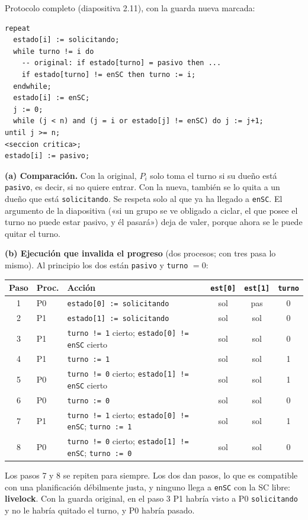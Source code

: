 \begin{solucion}
Protocolo completo (diapositiva 2.11), con la guarda nueva marcada:
\begin{lstlisting}
repeat
  estado[i] := solicitando;
  while turno != i do
    -- original: if estado[turno] = pasivo then ...
    if estado[turno] != enSC then turno := i;
  endwhile;
  estado[i] := enSC;
  j := 0;
  while (j < n) and (j = i or estado[j] != enSC) do j := j+1;
until j >= n;
<seccion critica>;
estado[i] := pasivo;
\end{lstlisting}
\textbf{(a) Comparación.} Con la original, $P_i$ solo toma el turno si su dueño está \texttt{pasivo}, es decir, si
no quiere entrar. Con la nueva, también se lo quita a un dueño que está \texttt{solicitando}. Se respeta solo al que
ya ha llegado a \texttt{enSC}. El argumento de la diapositiva («si un grupo se ve obligado a ciclar, el que posee el
turno no puede estar pasivo, y él pasará») deja de valer, porque ahora se le puede quitar el turno.

\textbf{(b) Ejecución que invalida el progreso} (dos procesos; con tres pasa lo mismo). Al principio los dos están
\texttt{pasivo} y \texttt{turno} $= 0$:
\begin{center}\footnotesize\setlength{\tabcolsep}{3pt}
\begin{tabular}{cllccc}
\toprule
\textbf{Paso} & \textbf{Proc.} & \textbf{Acción} & \texttt{est[0]} & \texttt{est[1]} & \texttt{turno} \\ \midrule
1 & P0 & \texttt{estado[0] := solicitando} & sol & pas & 0 \\
2 & P1 & \texttt{estado[1] := solicitando} & sol & sol & 0 \\
3 & P1 & \texttt{turno != 1} cierto; \texttt{estado[0] != enSC} cierto & sol & sol & 0 \\
4 & P1 & \texttt{turno := 1} & sol & sol & 1 \\
5 & P0 & \texttt{turno != 0} cierto; \texttt{estado[1] != enSC} cierto & sol & sol & 1 \\
6 & P0 & \texttt{turno := 0} & sol & sol & 0 \\
7 & P1 & \texttt{turno != 1} cierto; \texttt{estado[0] != enSC}; \texttt{turno := 1} & sol & sol & 1 \\
8 & P0 & \texttt{turno != 0} cierto; \texttt{estado[1] != enSC}; \texttt{turno := 0} & sol & sol & 0 \\
\bottomrule
\end{tabular}
\end{center}
Los pasos 7 y 8 se repiten para siempre. Los dos dan pasos, lo que es compatible con una planificación débilmente
justa, y ninguno llega a \texttt{enSC} con la SC libre: \textbf{livelock}. Con la guarda original, en el paso 3 P1
habría visto a P0 \texttt{solicitando} y no le habría quitado el turno, y P0 habría pasado.


\end{solucion}
